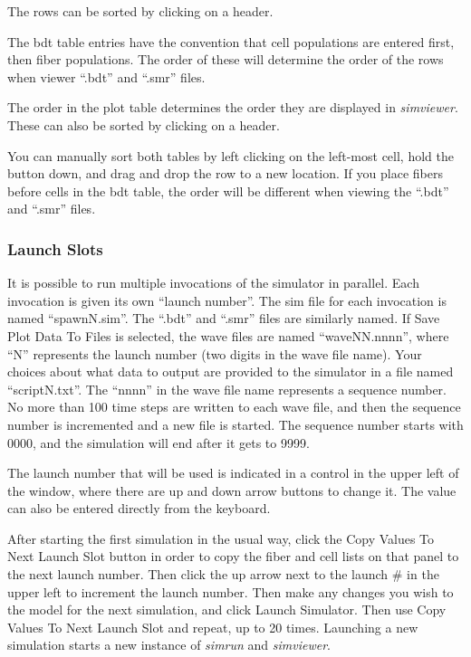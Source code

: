 \documentclass[12pt,openany,oneside]{book}
\newcommand{\prog}[1]{\textit{{#1}}}
\newcommand{\ext}[1]{{{``.#1''}}}
\newcommand{\inquotes}[1]{{{``#1''}}}
\begin{document}
The rows can be sorted by clicking on a header.

The bdt table entries have the convention that cell populations are
entered first, then fiber populations. The order of these will determine
the order of the rows when viewer \ext{bdt} and \ext{smr} files. 

The order in the plot table determines the order they are displayed in
\prog{simviewer}. These can also be sorted by clicking on a header.

You can manually sort both tables by left clicking on the left-most cell,
hold the button down, and drag and drop the row to a new location. If you
place fibers before cells in the bdt table, the order will be different
when viewing the \ext{bdt} and \ext{smr} files.


\subsubsection{Launch Slots}

It is possible to run multiple invocations of the simulator in parallel.
Each invocation is given its own \inquotes{launch number}. The sim file
for each invocation is named \inquotes{spawnN.sim}. The \ext{bdt} and
\ext{smr} files are similarly named.  If Save Plot Data To Files is
selected, the wave files are named \inquotes{waveNN.nnnn}, where
\inquotes{N} represents the launch number (two digits in the wave file
name). Your choices about what data to output are provided to the
simulator in a file named \inquotes{scriptN.txt}. The \inquotes{nnnn} in
the wave file name represents a sequence number. No more than 100 time
steps are written to each wave file, and then the sequence number is
incremented and a new file is started. The sequence number starts with
0000, and the simulation will end after it gets to 9999.

The launch number that will be used is indicated in
a control in the upper left of the window, where there are up and down
arrow buttons to change it. The value can also be entered directly from
the keyboard.

After starting the first simulation in the usual way, click the Copy
Values To Next Launch Slot button in order to copy the fiber and cell
lists on that panel to the next launch number. Then click the up arrow
next to the launch \# in the upper left to increment the launch number.
Then make any changes you wish to the model for the next simulation, and
click Launch Simulator. Then use Copy Values To Next Launch Slot and
repeat, up to 20 times. Launching a new simulation starts a new instance
of \prog{simrun} and \prog{simviewer}.
\end{document}
